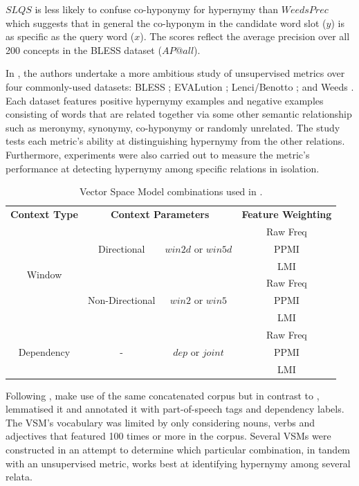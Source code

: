 $SLQS$ is less likely to confuse co-hyponymy for hypernymy than $WeedsPrec$ which suggests that in general the co-hyponym in the candidate word slot ($y$) is as specific as the query word ($x$).  The scores reflect the average precision over all 200 concepts in the BLESS dataset ($AP@all$).

In \citep{shwartz2017siege}, the authors undertake a more ambitious study of unsupervised metrics over four commonly-used datasets: BLESS \citep{Baroni2011}; EVALution \citep{santus2015evalution}; Lenci/Benotto \citep{benotto2015distributional}; and Weeds \citep{weeds2014learning}.  Each dataset features positive hypernymy examples and negative examples consisting of words that are related together via some other semantic relationship such as meronymy, synonymy, co-hyponymy or randomly unrelated.  The study tests each metric’s ability at distinguishing hypernymy from the other relations.  Furthermore, experiments were also carried out to measure the metric’s performance at detecting hypernymy among specific relations in isolation. 

\begin{table}\centering
    \begin{tabular}{@{}cccc@{}} \toprule
    \textbf{Context Type} & \multicolumn{2}{c}{\textbf{Context Parameters}} & \textbf{Feature Weighting} \\ \cmidrule{1-4}
    \multirow{6}{*}{Window} & 
    \multirow{3}{*}{Directional} &
    \multirow{3}{*}{$win2d$ or $win5d$} & Raw Freq \\
    & & & PPMI \\
    & & & LMI \\ 
    \cmidrule{2-4}
    & \multirow{3}{*}{Non-Directional} &
      \multirow{3}{*}{$win2$ or $win5$} & Raw Freq \\
    & & & PPMI \\
    & & & LMI \\ 
    \cmidrule{1-4}
    \multirow{3}{*}{Dependency} & 
    \multirow{3}{*}{-} &
    \multirow{3}{*}{$dep$ or $joint$} & Raw Freq \\
    & & & PPMI \\
    & & & LMI \\
    \bottomrule
    \end{tabular}
    \caption{Vector Space Model combinations used in \citep{shwartz2017siege}.}\label{tab:siege_vector_spaces}
\end{table}

Following \citep{santus2014chasing}, \citeauthor{shwartz2017siege} make use of the same concatenated corpus but in contrast to \citeauthor{santus2014chasing}, lemmatised it and annotated it with part-of-speech tags and dependency labels.  The \ac{VSM}’s vocabulary was limited by only considering nouns, verbs and adjectives that featured 100 times or more in the corpus.  Several \acl{VSM}s were constructed in an attempt to determine which particular combination, in tandem with an unsupervised metric, works best at identifying hypernymy among several relata.  


